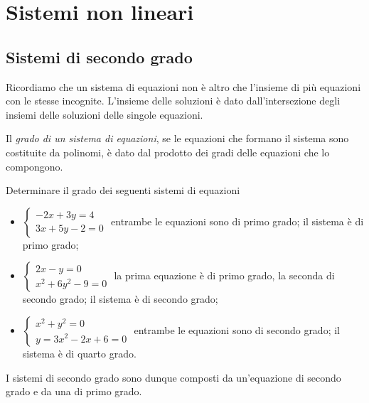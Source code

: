 \chapter{Sistemi non lineari}
\section{Sistemi di secondo grado}
Ricordiamo che un sistema di equazioni non è altro che l'insieme di più equazioni con le stesse incognite. L'insieme delle soluzioni è dato dall'intersezione degli insiemi delle soluzioni delle singole equazioni.

\begin{definizione}
Il \emph{grado di un sistema di equazioni}, se le equazioni che formano il sistema sono costituite da polinomi, è dato dal prodotto dei gradi delle equazioni che lo compongono.
\end{definizione}

\begin{exrig}
\begin{esempio}
Determinare il grado dei seguenti sistemi di equazioni

\begin{itemize}
\item $\left\{\begin{array}{l}-2x+3y=4 \\3x+5y-2=0\end{array}\right.$ entrambe le equazioni sono di primo grado; il sistema è di primo grado;
\item $\left\{\begin{array}{l}2x-y=0 \\x^2+6y^2-9=0\end{array}\right.$ la prima equazione è di primo grado, la seconda di secondo grado; il sistema è di secondo grado;
\item $\left\{\begin{array}{l}x^2+y^2=0 \\y=3x^2-2x+6=0\end{array}\right.$ entrambe le equazioni sono di secondo grado; il sistema è di quarto grado.
\end{itemize}
\end{esempio}
\end{exrig}
I sistemi di secondo grado sono dunque composti da un'equazione di secondo grado e da una di primo grado.


